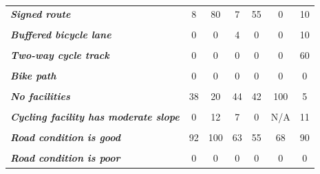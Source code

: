 \documentclass[]{elsarticle} %
\begin{document}
\begin{table}
{\begin{tabular}[t]{>{}lcccccc}
\em{\textbf{Signed route}} & 8 & 80 & 7 & 55 & 0 & 10\\
\em{\textbf{\cellcolor{gray!6}{Bicycle lane - marked}}} & \cellcolor{gray!6}{54} & \cellcolor{gray!6}{0} & \cellcolor{gray!6}{26} & \cellcolor{gray!6}{0} & \cellcolor{gray!6}{0} & \cellcolor{gray!6}{5}\\
\addlinespace
\em{\textbf{Buffered bicycle lane}} & 0 & 0 & 4 & 0 & 0 & 10\\
\em{\textbf{\cellcolor{gray!6}{Protected bicycle lane}}} & \cellcolor{gray!6}{0} & \cellcolor{gray!6}{0} & \cellcolor{gray!6}{0} & \cellcolor{gray!6}{0} & \cellcolor{gray!6}{0} & \cellcolor{gray!6}{10}\\
\em{\textbf{Two-way cycle track}} & 0 & 0 & 0 & 0 & 0 & 60\\
\em{\textbf{\cellcolor{gray!6}{Multi-use trail}}} & \cellcolor{gray!6}{0} & \cellcolor{gray!6}{0} & \cellcolor{gray!6}{15} & \cellcolor{gray!6}{3} & \cellcolor{gray!6}{0} & \cellcolor{gray!6}{0}\\
\em{\textbf{Bike path}} & 0 & 0 & 0 & 0 & 0 & 0\\
\addlinespace
\em{\textbf{\cellcolor{gray!6}{Paved shoulder}}} & \cellcolor{gray!6}{0} & \cellcolor{gray!6}{0} & \cellcolor{gray!6}{0} & \cellcolor{gray!6}{0} & \cellcolor{gray!6}{0} & \cellcolor{gray!6}{0}\\
\em{\textbf{No facilities}} & 38 & 20 & 44 & 42 & 100 & 5\\
\em{\textbf{\cellcolor{gray!6}{Cycling facility has flat or gentle slope}}} & \cellcolor{gray!6}{100} & \cellcolor{gray!6}{88} & \cellcolor{gray!6}{93} & \cellcolor{gray!6}{100} & \cellcolor{gray!6}{N/A} & \cellcolor{gray!6}{84}\\
\em{\textbf{Cycling facility has moderate slope}} & 0 & 12 & 7 & 0 & N/A & 11\\
\em{\textbf{\cellcolor{gray!6}{Cycling facility has steep slope}}} & \cellcolor{gray!6}{0} & \cellcolor{gray!6}{0} & \cellcolor{gray!6}{0} & \cellcolor{gray!6}{0} & \cellcolor{gray!6}{N/A} & \cellcolor{gray!6}{5}\\
\addlinespace
\em{\textbf{Road condition is good}} & 92 & 100 & 63 & 55 & 68 & 90\\
\em{\textbf{\cellcolor{gray!6}{Road condition is moderate}}} & \cellcolor{gray!6}{8} & \cellcolor{gray!6}{0} & \cellcolor{gray!6}{22} & \cellcolor{gray!6}{29} & \cellcolor{gray!6}{32} & \cellcolor{gray!6}{10}\\
\em{\textbf{Road condition is poor}} & 0 & 0 & 0 & 0 & 0 & 0\\

\end{tabular}}
\end{table}
\end{document}
